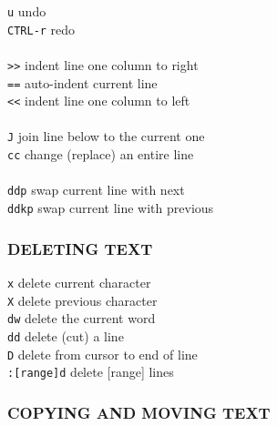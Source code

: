\documentclass[10pt,a4paper,landscape]{article}
\begin{document}
\begin{multicols}{3}
    \colorbox{gray!20}{\lstinline{u}}                   undo \\
    \colorbox{gray!20}{\lstinline{CTRL-r}}              redo \\
 \\
    \colorbox{gray!20}{\lstinline{>>}}                  indent line one column to right \\
    \colorbox{gray!20}{\lstinline{==}}                  auto-indent current line \\
    \colorbox{gray!20}{\lstinline{<<}}                  indent line one column to left \\
 \\
    \colorbox{gray!20}{\lstinline{J}}                   join line below to the current one \\
    \colorbox{gray!20}{\lstinline{cc}}                  change (replace) an entire line \\
 \\
    \colorbox{gray!20}{\lstinline{ddp}}                 swap current line with next \\
    \colorbox{gray!20}{\lstinline{ddkp}}                swap current line with previous \\
    
    
    
    \subsubsection*{
    DELETING TEXT
    }
    
    \colorbox{gray!20}{\lstinline{x}}                   delete current character \\
    \colorbox{gray!20}{\lstinline{X}}                   delete previous character \\
    \colorbox{gray!20}{\lstinline{dw}}                  delete the current word \\
    \colorbox{gray!20}{\lstinline{dd}}                  delete (cut) a line \\
    \colorbox{gray!20}{\lstinline{D}}                   delete from cursor to end of line \\
    \colorbox{gray!20}{\lstinline{:[range]d}}           delete [range] lines \\
    
    
    
    \subsubsection*{
    COPYING AND MOVING TEXT
    }
    

\end{multicols}
\end{document}
